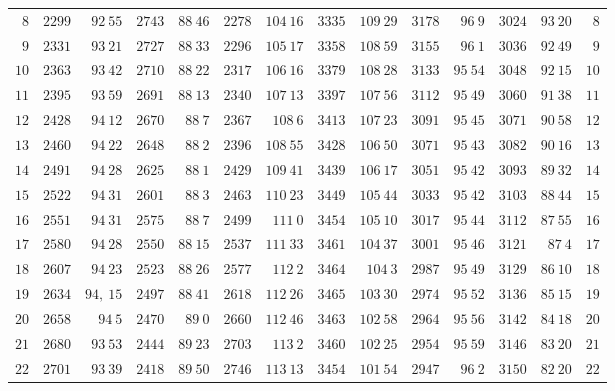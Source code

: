 \begin{GaussVICeresFrame}{.92}
{\begin{tabular}{r@{\GaussVICeresRule}r|r@{\GaussVICeresRule}r|r@{\GaussVICeresRule}r|r@{\GaussVICeresRule}r|r@{\GaussVICeresRule}r|r@{\GaussVICeresRule}r|r@{\GaussVICeresRule}r}
$8$ & $2299$ & $92\ 55$ & $2743$ & $88\ 46$ & $2278$ & $104\ 16$ & $3335$ & $109\ 29$ & $3178$ & $96\ 9$ & $3024$ & $93\ 20$ & $8$ \\
$9$ & $2331$ & $93\ 21$ & $2727$ & $88\ 33$ & $2296$ & $105\ 17$ & $3358$ & $108\ 59$ & $3155$ & $96\ 1$ & $3036$ & $92\ 49$ & $9$ \\
$10$ & $2363$ & $93\ 42$ & $2710$ & $88\ 22$ & $2317$ & $106\ 16$ & $3379$ & $108\ 28$ & $3133$ & $95\ 54$ & $3048$ & $92\ 15$ & $10$ \\[3pt]
$11$ & $2395$ & $93\ 59$ & $2691$ & $88\ 13$ & $2340$ & $107\ 13$ & $3397$ & $107\ 56$ & $3112$ & $95\ 49$ & $3060$ & $91\ 38$ & $11$ \\
$12$ & $2428$ & $94\ 12$ & $2670$ & $88\ 7$ & $2367$ & $108\ 6$ & $3413$ & $107\ 23$ & $3091$ & $95\ 45$ & $3071$ & $90\ 58$ & $12$ \\
$13$ & $2460$ & $94\ 22$ & $2648$ & $88\ 2$ & $2396$ & $108\ 55$ & $3428$ & $106\ 50$ & $3071$ & $95\ 43$ & $3082$ & $90\ 16$ & $13$ \\
$14$ & $2491$ & $94\ 28$ & $2625$ & $88\ 1$ & $2429$ & $109\ 41$ & $3439$ & $106\ 17$ & $3051$ & $95\ 42$ & $3093$ & $89\ 32$ & $14$ \\
$15$ & $2522$ & $94\ 31$ & $2601$ & $88\ 3$ & $2463$ & $110\ 23$ & $3449$ & $105\ 44$ & $3033$ & $95\ 42$ & $3103$ & $88\ 44$ & $15$ \\[3pt]
$16$ & $2551$ & $94\ 31$ & $2575$ & $88\ 7$ & $2499$ & $111\ 0$ & $3454$ & $105\ 10$ & $3017$ & $95\ 44$ & $3112$ & $87\ 55$ & $16$ \\
$17$ & $2580$ & $94\ 28$ & $2550$ & $88\ 15$ & $2537$ & $111\ 33$ & $3461$ & $104\ 37$ & $3001$ & $95\ 46$ & $3121$ & $87\ 4$ & $17$ \\
$18$ & $2607$ & $94\ 23$ & $2523$ & $88\ 26$ & $2577$ & $112\ 2$ & $3464$ & $104\ 3$ & $2987$ & $95\ 49$ & $3129$ & $86\ 10$ & $18$ \\
$19$ & $2634$ & $94,\ 15$ & $2497$ & $88\ 41$ & $2618$ & $112\ 26$ & $3465$ & $103\ 30$ & $2974$ & $95\ 52$ & $3136$ & $85\ 15$ & $19$ \\
$20$ & $2658$ & $94\ 5$ & $2470$ & $89\ 0$ & $2660$ & $112\ 46$ & $3463$ & $102\ 58$ & $2964$ & $95\ 56$ & $3142$ & $84\ 18$ & $20$ \\[3pt]
$21$ & $2680$ & $93\ 53$ & $2444$ & $89\ 23$ & $2703$ & $113\ 2$ & $3460$ & $102\ 25$ & $2954$ & $95\ 59$ & $3146$ & $83\ 20$ & $21$ \\
$22$ & $2701$ & $93\ 39$ & $2418$ & $89\ 50$ & $2746$ & $113\ 13$ & $3454$ & $101\ 54$ & $2947$ & $96\ 2$ & $3150$ & $82\ 20$ & $22$ \\

\end{tabular}}
\end{GaussVICeresFrame}
